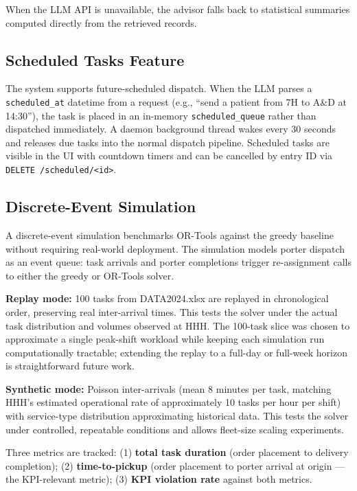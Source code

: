 \documentclass[12pt,a4paper]{article}
\begin{document}
When the LLM API is unavailable, the advisor falls back to statistical summaries computed directly from the retrieved records.

\subsection{Scheduled Tasks Feature}

The system supports future-scheduled dispatch. When the LLM parses a \texttt{scheduled\_at} datetime from a request (e.g., ``send a patient from 7H to A\&D at 14:30''), the task is placed in an in-memory \texttt{scheduled\_queue} rather than dispatched immediately. A daemon background thread wakes every 30 seconds and releases due tasks into the normal dispatch pipeline. Scheduled tasks are visible in the UI with countdown timers and can be cancelled by entry ID via \texttt{DELETE /scheduled/<id>}.

\subsection{Discrete-Event Simulation}

A discrete-event simulation benchmarks OR-Tools against the greedy baseline without requiring real-world deployment. The simulation models porter dispatch as an event queue: task arrivals and porter completions trigger re-assignment calls to either the greedy or OR-Tools solver.

\textbf{Replay mode:} 100 tasks from DATA2024.xlsx are replayed in chronological order, preserving real inter-arrival times. This tests the solver under the actual task distribution and volumes observed at HHH. The 100-task slice was chosen to approximate a single peak-shift workload while keeping each simulation run computationally tractable; extending the replay to a full-day or full-week horizon is straightforward future work.

\textbf{Synthetic mode:} Poisson inter-arrivals (mean 8 minutes per task, matching HHH's estimated operational rate of approximately 10 tasks per hour per shift) with service-type distribution approximating historical data. This tests the solver under controlled, repeatable conditions and allows fleet-size scaling experiments.

Three metrics are tracked: (1) \textbf{total task duration} (order placement to delivery completion); (2) \textbf{time-to-pickup} (order placement to porter arrival at origin --- the KPI-relevant metric); (3) \textbf{KPI violation rate} against both metrics.
\end{document}
